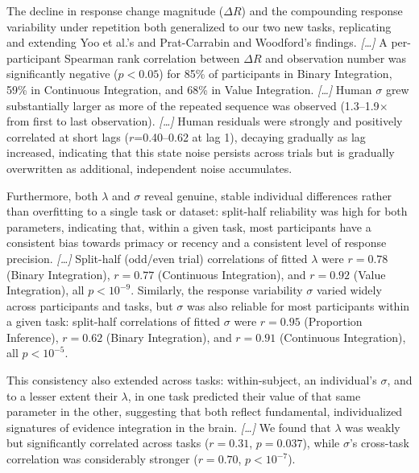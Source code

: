 \begin{ms}
The decline in response change magnitude ($\Delta R$) and the compounding response variability under repetition both generalized to our two new tasks, replicating and extending Yoo et al.'s \citep{yoo2025people} and Prat-Carrabin and Woodford's \citep{prat2024imprecise} findings. \textit{[\ldots]} A per-participant Spearman rank correlation between $\Delta R$ and observation number was significantly negative ($p<0.05$) for 85\% of participants in Binary Integration, 59\% in Continuous Integration, and 68\% in Value Integration. \textit{[\ldots]} Human $\sigma$ grew substantially larger as more of the repeated sequence was observed (1.3--1.9$\times$ from first to last observation). \textit{[\ldots]} Human residuals were strongly and positively correlated at short lags ($r$=0.40--0.62 at lag 1), decaying gradually as lag increased, indicating that this state noise persists across trials but is gradually overwritten as additional, independent noise accumulates.

Furthermore, both $\lambda$ and $\sigma$ reveal genuine, stable individual differences rather than overfitting to a single task or dataset: split-half reliability was high for both parameters, indicating that, within a given task, most participants have a consistent bias towards primacy or recency and a consistent level of response precision. \textit{[\ldots]} Split-half (odd/even trial) correlations of fitted $\lambda$ were $r=0.78$ (Binary Integration), $r=0.77$ (Continuous Integration), and $r=0.92$ (Value Integration), all $p<10^{-9}$. Similarly, the response variability $\sigma$ varied widely across participants and tasks, but $\sigma$ was also reliable for most participants within a given task: split-half correlations of fitted $\sigma$ were $r=0.95$ (Proportion Inference), $r=0.62$ (Binary Integration), and $r=0.91$ (Continuous Integration), all $p<10^{-5}$.

This consistency also extended across tasks: within-subject, an individual's $\sigma$, and to a lesser extent their $\lambda$, in one task predicted their value of that same parameter in the other, suggesting that both reflect fundamental, individualized signatures of evidence integration in the brain. \textit{[\ldots]} We found that $\lambda$ was weakly but significantly correlated across tasks ($r=0.31$, $p=0.037$), while $\sigma$'s cross-task correlation was considerably stronger ($r=0.70$, $p<10^{-7}$).
\end{ms}

